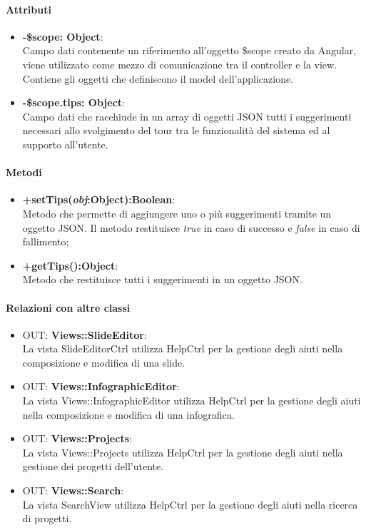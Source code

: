 	\paragraph{Attributi}
	\begin{itemize}
		\item \textbf{-\$scope: Object}:\\
				Campo dati contenente un riferimento all'oggetto \$scope creato da Angular, viene utilizzato come mezzo di comunicazione tra il controller e la view. Contiene gli oggetti che definiscono il model dell'applicazione.
		\item \textbf{-\$scope.tips: Object}:\\
				Campo dati che racchiude in un array di oggetti JSON tutti i suggerimenti necessari allo svolgimento del tour tra le funzionalità del sistema ed al supporto all'utente. 
	\end{itemize}
	
	\paragraph{Metodi}
	\begin{itemize}
	  \item \textbf{+setTips(\textit{obj}:Object):Boolean}:\\
		  Metodo che permette di aggiungere uno o più suggerimenti tramite un oggetto JSON. Il metodo restituisce \textit{true} in caso di successo e \textit{false} in caso di fallimento;
	  \item \textbf{+getTips():Object}:\\
		  Metodo che restituisce tutti i suggerimenti in un oggetto JSON.
	\end{itemize}
	\paragraph{Relazioni con altre classi}
	\begin{itemize}
	 \item OUT: \textbf{Views::SlideEditor}:\\
		La vista SlideEditorCtrl utilizza HelpCtrl per la gestione degli aiuti nella composizione e modifica di una slide.
	 \item OUT: \textbf{Views::InfographicEditor}:\\
		La vista Views::InfographicEditor utilizza HelpCtrl per la gestione degli aiuti nella composizione e modifica di una infografica.
	 \item OUT: \textbf{Views::Projects}:\\
		La vista Views::Projects utilizza HelpCtrl per la gestione degli aiuti nella gestione dei progetti dell'utente.
	 \item OUT: \textbf{Views::Search}:\\
		La vista SearchView utilizza HelpCtrl per la gestione degli aiuti nella ricerca di progetti.
	\end{itemize}

